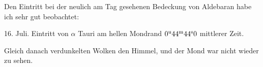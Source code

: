 Den Eintritt bei der neulich am Tag gesehenen Bedeckung von Aldebaran habe ich sehr gut beobachtet:

\begin{center}16. Juli. Eintritt von $\alpha$ Tauri am hellen Mondrand $0^{\rm u}44^{\rm m}44^{\rm s}0$ mittlerer Zeit.\end{center}

Gleich danach verdunkelten Wolken den Himmel, und der Mond war nicht wieder zu sehen.
